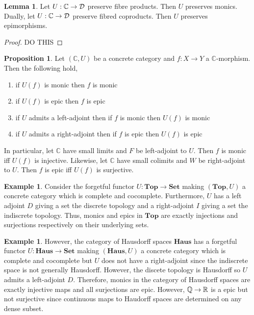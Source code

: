 \documentclass[12pt]{extarticle}
\newcommand{\R}{\mathbb{R}}
\newcommand{\Top}{\mathbf{Top}}
\newcommand{\Set}{\mathbf{Set}}
\theoremstyle{definition}
\newtheorem{lemma}[theorem]{Lemma}
\newtheorem{proposition}[theorem]{Proposition}
\newtheorem{example}[theorem]{Example}
\newcommand{\C}{\mathbb{C}}
\begin{document}
\begin{lemma}
Let $U : \C \to \D$ preserve fibre products. Then $U$ preserves monics. Dually, let $U : \C \to \D$ preserve fibred coproducts. Then $U$ preserves epimorphisms. 
\end{lemma}

\begin{proof}
DO THIS
\end{proof}

\begin{proposition}
Let $(\C, U)$ be a concrete category and $f : X \to Y$ a $\C$-morphism. Then the following hold,
\begin{enumerate}
\item if $U(f)$ is monic then $f$ is monic
\item if $U(f)$ is epic then $f$ is epic
\item if $U$ admits a left-adjoint then if $f$ is monic then $U(f)$ is monic
\item if $U$ admits a right-adjoint then if $f$ is epic then $U(f)$ is epic
\end{enumerate}
In particular, let $\C$ have small limits and $F$ be left-adjoint to $U$. Then $f$ is monic iff $U(f)$ is injective. Likewise, let $\C$ have small colimits and $W$ be right-adjoint to $U$. Then $f$ is epic iff $U(f)$ is surjective. 
\end{proposition}

\begin{example}
Consider the forgetful functor $U : \Top \to \Set$ making $(\Top, U)$ a concrete category which is complete and cocomplete. Furthermore, $U$ has a left adjoint $D$ giving a set the discrete topology and a right-adjoint $I$ giving a set the indiscrete topology. Thus, monics and epics in $\Top$ are exactly injections and surjections respectively on their underlying sets. 
\end{example}

\newcommand{\Haus}{\mathbf{Haus}}

\begin{example}
However, the category of Hausdorff spaces $\Haus$ has a forgetful functor $U : \Haus \to \Set$ making $(\Haus, U)$ a concrete category which is complete and cocomplete but $U$ does not have a right-adjoint since the indiscrete space is not generally Hausdorff. However, the discete topology is Hausdorff so $U$ admits a left-adjoint $D$. Therefore, monics in the category of Hausdorff spaces are exactly injective maps and all surjections are epic. However, $\Q \to \R$ is a epic but not surjective since continuous maps to Haudorff spaces are determined on any dense subset. 
\end{example}
\end{document}
